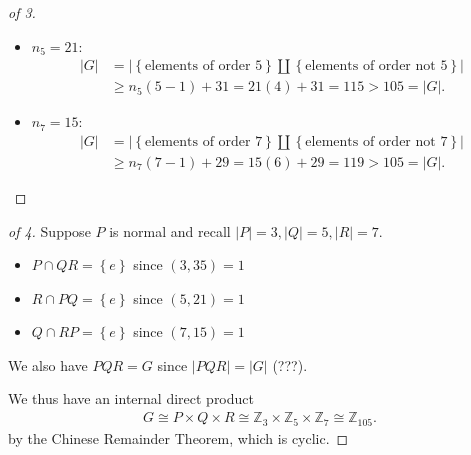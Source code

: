 \begin{solution}
\begin{proof}[of 3]
\begin{itemize}
  \begin{itemize}
  \item
    \(n_5 = 21\):
    \begin{align*}
    {\left\lvert {G} \right\rvert}  &= {\left\lvert {\left\{{\text{elements of order } 5}\right\} {\coprod}\left\{{\text{elements of order not } 5}\right\}} \right\rvert} \\
    &\geq n_5(5-1) + 31 = 21(4) + 31 = 115 > 105 = {\left\lvert {G} \right\rvert}
    .\end{align*}
  \item
    \(n_7 = 15\):
    \begin{align*}
    {\left\lvert {G} \right\rvert}  &= {\left\lvert {\left\{{\text{elements of order } 7}\right\} {\coprod}\left\{{\text{elements of order not } 7}\right\}} \right\rvert} \\
    &\geq n_7(7-1) + 29 = 15(6) + 29 = 119 > 105 = {\left\lvert {G} \right\rvert}
    .\end{align*}
  \end{itemize}
\end{itemize}

\end{proof}

\begin{proof}[of 4]

Suppose \(P\) is normal and recall
\({\left\lvert {P} \right\rvert} = 3, {\left\lvert {Q} \right\rvert} = 5, {\left\lvert {R} \right\rvert} = 7\).

\begin{itemize}
\tightlist
\item
  \(P\cap QR = \left\{{e}\right\}\) since \((3, 35) = 1\)
\item
  \(R\cap PQ = \left\{{e}\right\}\) since \((5, 21) = 1\)
\item
  \(Q\cap RP = \left\{{e}\right\}\) since \((7, 15) = 1\)
\end{itemize}

We also have \(PQR = G\) since
\({\left\lvert {PQR} \right\rvert} = {\left\lvert {G} \right\rvert}\)
(???).

We thus have an internal direct product
\begin{align*}
G \cong P\times Q \times R \cong {\mathbb{Z}}_3 \times{\mathbb{Z}}_5 \times{\mathbb{Z}}_7 \cong {\mathbb{Z}}_{105}
.\end{align*}
by the Chinese Remainder Theorem, which is cyclic.

\end{proof}

\end{solution}

